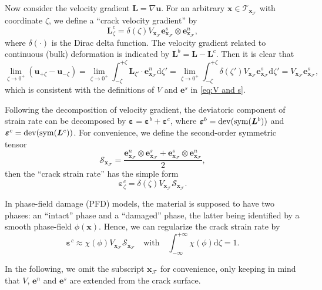 \documentclass{article}
\begin{document}
Now consider the velocity gradient $\bm L = \nabla{\bm u}$. For an arbitrary $\bm x\in\mathcal T_{\bm x_\mathcal F}$ with coordinate $\zeta$, we define a ``crack velocity gradient'' by
\begin{equation}
  \bm L_\zeta^c = \delta(\zeta)V_{\bm x_\mathcal F}\bm e^s_{\bm x_\mathcal F}\otimes\bm e^n_{\bm x_\mathcal F},
\end{equation}
where $\delta(\cdot)$ is the Dirac delta function. The velocity gradient related to continuous (bulk) deformation is indicated by $\bm L^b = \bm L - \bm L^c$. Then it is clear that
\[
  \lim_{\zeta\to 0^+}({\bm u}_{+\zeta} - {\bm u}_{-\zeta}) = \lim_{\zeta\to 0^+}\int_{-\zeta}^{+\zeta}\bm L_{\zeta'}\cdot\bm e^n_{\bm x_\mathcal F}\mathrm d\zeta' = \lim_{\zeta\to 0^+}\int_{-\zeta}^{+\zeta}\delta(\zeta')V_{\bm x_\mathcal F}\bm e^s_{\bm x_\mathcal F}\mathrm d\zeta' = V_{\bm x_\mathcal F}\bm e^s_{\bm x_\mathcal F},
\]
which is consistent with the definitions of $V$ and $\bm e^s$ in \eqref{eq:V and s}.

Following the decomposition of velocity gradient, the deviatoric component of strain rate can be decomposed by ${\bm\varepsilon} = {\bm\varepsilon}^b + {\bm\varepsilon}^c$, where ${\bm\varepsilon}^b = {\rm dev}({\rm sym}(\bm L^b))$ and ${\bm\varepsilon}^c = {\rm dev}({\rm sym}(\bm L^c))$. For convenience, we define the second-order symmetric tensor
\begin{equation}
  \bm{\mathcal S}_{\bm x_\mathcal F} = \frac{\bm e^n_{\bm x_\mathcal F}\otimes\bm e^s_{\bm x_\mathcal F} + \bm e^s_{\bm x_\mathcal F}\otimes\bm e^n_{\bm x_\mathcal F}}{2},
\end{equation}
then the ``crack strain rate'' has the simple form 
\begin{equation}\label{eq:crack strain raw}
  \bm\varepsilon_\zeta^c = \delta(\zeta)V_{\bm x_\mathcal F}\bm{\mathcal S}_{\bm x_\mathcal F}.
\end{equation}

In phase-field damage (PFD) models, the material is supposed to have two phases: an ``intact'' phase and a ``damaged'' phase, the latter being identified by a smooth phase-field $\phi(\bm x)$. Hence, we can regularize the crack strain rate by
\begin{equation}
  \bm\varepsilon^c\approx\chi(\phi)V_{\bm x_\mathcal F}\bm{\mathcal S}_{\bm x_\mathcal F}\quad\text{with}\quad\int_{-\infty}^{+\infty}\chi(\phi)\mathrm d\zeta = 1.
\end{equation}

In the following, we omit the subscript $\bm x_\mathcal F$ for convenience, only keeping in mind that $V$, $\bm e^n$ and $\bm e^s$ are extended from the crack surface.
\end{document}
